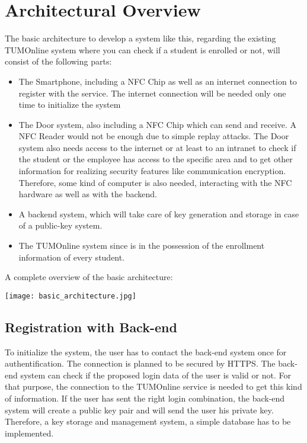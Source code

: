\section{Architectural Overview}\label{sec:arch}

The basic architecture to develop a system like this, regarding the existing TUMOnline system where you can check if a student is enrolled or not, will consist of the following parts:

\begin{itemize}
\item The Smartphone, including a NFC Chip as well as an internet connection to register with the service. The internet connection will be needed only one time to initialize the system
\item The Door system, also including a NFC Chip which can send and receive. A NFC Reader would not be enough due to simple replay attacks. The Door system also needs access to the internet or at least to an intranet to check if the student or the employee has access to the specific area and to get other information for realizing security features like communication encryption. Therefore, some kind of computer is also needed, interacting with the NFC hardware as well as with the backend.
\item A backend system, which will take care of key generation and storage in case of a public-key system.

\item The TUMOnline system since is in the possession of the enrollment information of every student.
\end{itemize} 
 
 A complete overview of the basic architecture: \newline
 \begin{center}
	\texttt{[image: basic\_architecture.jpg]}
\end{center}


\subsection{Registration with Back-end}
To initialize the system, the user has to contact the back-end system once for authentification. The connection is planned to be secured by HTTPS. The back-end system can check if the proposed login data of the user is valid or not. For that purpose, the connection to the TUMOnline service is needed to get this kind of  information. If the user has sent the right login combination, the back-end system will create a public key pair and will send the user his private key. Therefore, a key storage and management system, a simple database has to be implemented.


